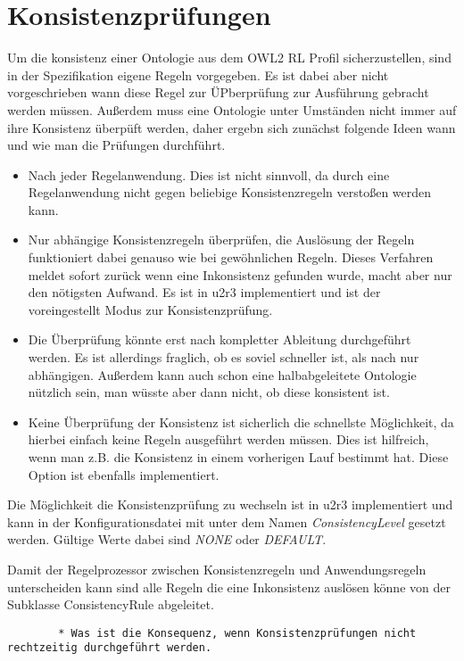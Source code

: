 \section{Konsistenzprüfungen}
Um die konsistenz einer Ontologie aus dem OWL2 RL Profil sicherzustellen, sind in der Spezifikation eigene Regeln vorgegeben. Es ist dabei aber nicht vorgeschrieben wann diese Regel zur ÜPberprüfung zur Ausführung gebracht werden müssen. Außerdem muss eine Ontologie unter Umständen nicht immer auf ihre Konsistenz überpüft werden, daher ergebn sich zunächst folgende Ideen wann und wie man die Prüfungen durchführt.

\begin{itemize}
  \item Nach jeder Regelanwendung. Dies ist nicht sinnvoll, da durch eine Regelanwendung nicht gegen beliebige Konsistenzregeln verstoßen werden kann.
  \item Nur abhängige Konsistenzregeln überprüfen, die Auslösung der Regeln funktioniert dabei genauso wie bei gewöhnlichen Regeln. Dieses Verfahren meldet sofort zurück wenn eine Inkonsistenz gefunden wurde, macht aber nur den nötigsten Aufwand. Es ist in u2r3 implementiert und ist der voreingestellt Modus zur Konsistenzprüfung.
  \item Die Überprüfung könnte erst nach kompletter Ableitung durchgeführt werden. Es ist allerdings fraglich, ob es soviel schneller ist, als nach nur abhängigen. Außerdem kann auch schon eine halbabgeleitete Ontologie nützlich sein, man wüsste aber dann nicht, ob diese konsistent ist.
  \item Keine Überprüfung der Konsistenz ist sicherlich die schnellste Möglichkeit, da hierbei einfach keine Regeln ausgeführt werden müssen. Dies ist hilfreich, wenn man z.B. die Konsistenz in einem vorherigen Lauf bestimmt hat. Diese Option ist ebenfalls implementiert.
\end{itemize} 
Die Möglichkeit die Konsistenzprüfung zu wechseln ist in u2r3 implementiert und kann in der Konfigurationsdatei mit unter dem Namen \emph{ConsistencyLevel} gesetzt werden. Gültige Werte dabei sind \emph{NONE} oder \emph{DEFAULT}.

Damit der Regelprozessor zwischen Konsistenzregeln und Anwendungsregeln unterscheiden kann sind alle Regeln die eine Inkonsistenz auslösen könne von der Subklasse ConsistencyRule abgeleitet.

\begin{verbatim}
        * Was ist die Konsequenz, wenn Konsistenzprüfungen nicht rechtzeitig durchgeführt werden.
\end{verbatim}

